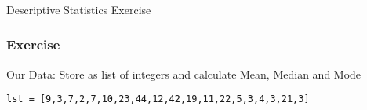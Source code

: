 \begin{frame}[fragile]\frametitle{}
\begin{center}
{\Large Descriptive Statistics Exercise}
\end{center}
\end{frame}

\begin{frame}[fragile]\frametitle{Exercise}	
Our Data: Store as list of integers and calculate Mean, Median and Mode

\begin{lstlisting}
lst = [9,3,7,2,7,10,23,44,12,42,19,11,22,5,3,4,3,21,3]
\end{lstlisting}

\end{frame}






